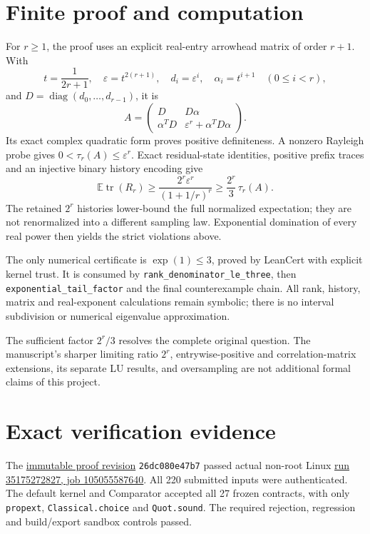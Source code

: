 \documentclass[11pt,a4paper]{article}
\begin{document}
\section*{Finite proof and computation}
For $r\ge1$, the proof uses an explicit real-entry arrowhead matrix of order
$r+1$. With
\[
 t=\frac1{2r+1},\quad \varepsilon=t^{2(r+1)},\quad
 d_i=\varepsilon^i,\quad \alpha_i=t^{i+1}\quad(0\le i<r),
\]
and $D=\operatorname{diag}(d_0,\ldots,d_{r-1})$, it is
\[
 A=\begin{pmatrix}
 D&D\alpha\\
 \alpha^{T}D&\varepsilon^r+\alpha^{T}D\alpha
 \end{pmatrix}.
\]
Its exact complex quadratic form proves positive definiteness. A nonzero
Rayleigh probe gives $0<\tau_r(A)\le\varepsilon^r$. Exact residual-state
identities, positive prefix traces and an injective binary history encoding
give
\[
 \mathbb E\operatorname{tr}(R_r)
 \ge \frac{2^r\varepsilon^r}{(1+1/r)^r}
 \ge \frac{2^r}{3}\,\tau_r(A).
\]
The retained $2^r$ histories lower-bound the full normalized expectation;
they are not renormalized into a different sampling law. Exponential
domination of every real power then yields the strict violations above.

The only numerical certificate is $\exp(1)\le3$, proved by LeanCert with
explicit kernel trust. It is consumed by
\texttt{rank\_denominator\_le\_three}, then
\texttt{exponential\_tail\_factor} and the final counterexample chain.
All rank, history, matrix and real-exponent calculations remain symbolic;
there is no interval subdivision or numerical eigenvalue approximation.

The sufficient factor $2^r/3$ resolves the complete original question.
The manuscript's sharper limiting ratio $2^r$, entrywise-positive and
correlation-matrix extensions, its separate LU results, and oversampling
are not additional formal claims of this project.

\section*{Exact verification evidence}
The \href{https://github.com/sgstepaniants/OpenProblemsInNLA/blob/26dc080e47b75a3aaf2e75fc2a282d0b8f4a4bbb/randomized-and-low-rank-approximation/RA-02/lean/Solution.lean}{immutable proof revision}
\texttt{26dc080e47b7} passed actual non-root Linux
\href{https://github.com/sgstepaniants/OpenProblemsInNLA/actions/runs/35175272827/job/105055587640}{run 35175272827, job 105055587640}.
All 220 submitted inputs were authenticated. The default kernel and
Comparator accepted all 27 frozen contracts, with only
\texttt{propext}, \texttt{Classical.choice} and \texttt{Quot.sound}.
The required rejection, regression and build/export sandbox controls passed.
\end{document}
